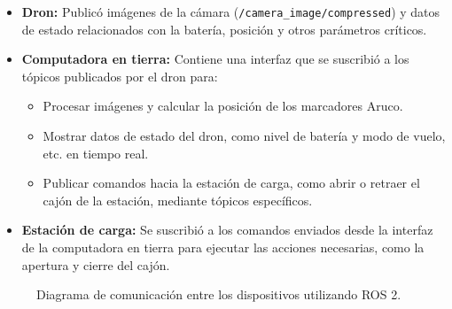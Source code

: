     \begin{itemize}
        \item \textbf{Dron:} 
        Publicó imágenes de la cámara (\texttt{/camera\_image/compressed}) y datos de estado relacionados con la batería, posición y otros parámetros críticos.
        \item \textbf{Computadora en tierra:} 
        Contiene una interfaz que se suscribió a los tópicos publicados por el dron para:
        \begin{itemize}
            \item Procesar imágenes y calcular la posición de los marcadores Aruco.
            \item Mostrar datos de estado del dron, como nivel de batería y modo de vuelo, etc. en tiempo real.
            \item Publicar comandos hacia la estación de carga, como abrir o retraer el cajón de la estación, mediante tópicos específicos.
        \end{itemize}
        \item \textbf{Estación de carga:} 
        Se suscribió a los comandos enviados desde la interfaz de la computadora en tierra para ejecutar las acciones necesarias, como la apertura y cierre del cajón.
    \end{itemize}
    
    \begin{figure}
        \centering
        \caption{Diagrama de comunicación entre los dispositivos utilizando ROS 2.}
    \end{figure}
    

    




